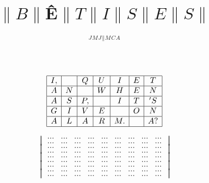 \documentclass[titlepage, 12pt]{article}
\title{{$\|B\|$\^E$\|T\|I\|S\|E\|S\|$}}
\author{${}^J{}^M{}^J{}^\| {}^M{}^C{}^A$}
\date{}
\begin{document}
\maketitle

\begin{equation*}
    \left.
    \begin{array}{|c|c|c|c|c|c|c|}
        \hline I, & {} & Q & U & I & E & T \\
        \hline A & N & {} & W & H & E & N \\
        \hline A & S & P, & {} & I & T & 'S \\
        \hline G & I & V & E & {} & O & N \\
        \hline A & L & A & R & M. & {} & A? \\
        \hline 
    \end{array}
    \right.
\end{equation*}

\begin{equation*} 
    \begin{vmatrix}
        \dots & \dots & \dots & \dots & \dots & \dots & \dots & \dots & \dots \\%
        \dots & \dots & \dots & \dots & \dots & \dots & \dots & \dots & \dots \\ %
        \dots & \dots & \dots & \dots & \dots & \dots & \dots & \dots & \dots \\ %
        \dots & \dots & \dots & \dots & \dots & \dots & \dots & \dots & \dots \\%
        \dots & \dots & \dots & \dots & \dots & \dots & \dots & \dots & \dots \\ %
        \dots & \dots & \dots & \dots & \dots & \dots & \dots & \dots & \dots \\ 
        \dots & \dots & \dots & \dots & \dots & \dots & \dots & \dots & \dots \\
        \dots & \dots & \dots & \dots & \dots & \dots & \dots & \dots & \dots \\ 
        \dots & \dots & \dots & \dots & \dots & \dots & \dots & \dots & \dots 
     \end{vmatrix} 
\end{equation*}
\end{document}
